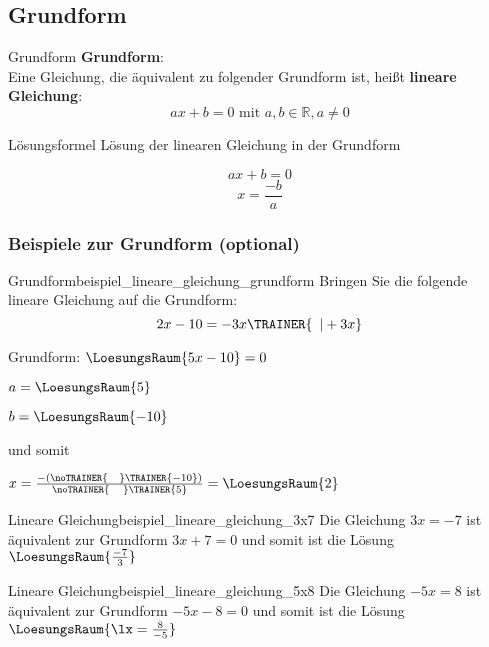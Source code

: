 \GESO{}

\newpage


\subsection{Grundform}
\begin{definition}{Grundform}{}
  \textbf{Grundform}:\\

  Eine Gleichung, die äquivalent zu folgender Grundform ist, heißt
  \textbf{lineare Gleichung}:\\
  $$ax+b=0 \text{ mit } a,b\in\mathbb{R}, a\ne 0$$
  
  \end{definition}

\begin{gesetz}{Lösungsformel}{}
 Lösung der linearen Gleichung in der Grundform

 $$ax+b=0$$
  $$x = \frac{-b}a$$
  
\end{gesetz}

\newpage
\subsubsection{Beispiele zur Grundform (optional)}


\begin{beispiel}{Grundform}{beispiel_lineare_gleichung_grundform}
  Bringen Sie die folgende lineare Gleichung auf die Grundform:
  $$2x-10 = -3x\TRAINER{\,\,\,| +3x}$$

  Grundform: $\LoesungsRaum{5x-10} = 0$

  $a = \LoesungsRaum{5}$

  $b = \LoesungsRaum{-10}$

  und somit

  \LARGE{$x=\frac{-(\noTRAINER{\,\,\,\,\,\,}\TRAINER{-10})}{\noTRAINER{\,\,\,\,\,\,\,}\TRAINER{5}}
    = \LoesungsRaum{2}$}

\end{beispiel}


\begin{beispiel}{Lineare Gleichung}{beispiel_lineare_gleichung_3x7}
  Die Gleichung $3x=-7$ ist äquivalent zur Grundform $3x+7=0$ und somit ist die Lösung $\LoesungsRaum{\frac{-7}{3}}$
  \end{beispiel}

\begin{beispiel}{Lineare Gleichung}{beispiel_lineare_gleichung_5x8}
  Die Gleichung $-5x=8$ ist äquivalent zur Grundform $-5x-8=0$ und somit ist die Lösung $\LoesungsRaum{\lx=\frac{8}{-5}}$
\end{beispiel}


\newpage
